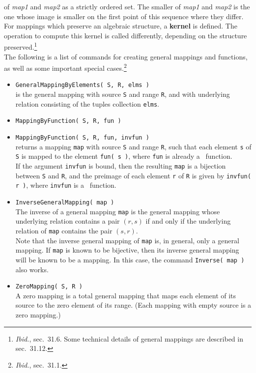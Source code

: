 of {\it map1} and {\it map2} as a strictly ordered set. 
The smaller of {\it map1} and {\it map2} is the one 
whose image is smaller on the first point of this sequence where they differ.
\\[5pt]
For mappings which preserve an algebraic structure, a {\bf kernel} is defined. 
The operation to compute this kernel is called differently, depending on the
structure preserved.\footnote{{\it Ibid.}, sec.~31.6.  Some technical
  details of general mappings are described in sec.~31.12.} 
\\[5pt]
The following is a list of commands for creating general mappings and functions, as
well as some important special cases.\footnote{{\it Ibid.}, sec.~31.1.}
\begin{itemize}
\item {\tt GeneralMappingByElements( S, R, elms )}\\
is the general mapping with source {\tt S} and range {\tt R}, and with underlying relation consisting of the tuples
collection {\tt elms}.
\item {\tt MappingByFunction( S, R, fun )}
\item {\tt MappingByFunction( S, R, fun, invfun )}\\
returns a mapping {\tt map} with source {\tt S} and range {\tt R}, such that each element
{\tt s} of {\tt S} is mapped to the element {\tt fun( s )}, where {\tt fun} is
already a \gap\ function.
\\[4pt]
If the argument {\tt invfun} is bound, then the resulting {\tt map} is a bijection
between {\tt S} and {\tt R}, and the preimage of each element {\tt r} of {\tt R} is
given by {\tt invfun( r )}, where {\tt invfun} is a \gap\ function.
\item {\tt InverseGeneralMapping( map )}\\
The inverse of a general mapping {\tt map} is the general mapping whose underlying relation
contains a pair $(r, s)$ if and only if the underlying relation of {\tt map} contains the pair $(s, r)$.
\\[4pt]
Note that the inverse general mapping of {\tt map} is, in general, only a general
mapping. If {\tt map} is known to be bijective, then its inverse general mapping will
be known to be a mapping. In this case, the command {\tt Inverse( map )} also works.
\item  {\tt ZeroMapping( S, R )}\\
A zero mapping is a total general mapping that maps each element of its source to the zero element of its
range. (Each mapping with empty source is a zero mapping.)

\end{itemize}
